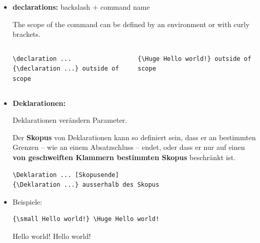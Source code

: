 \begin{frame}[fragile]
\begin{itemize}

	\item \textbf{declarations:} backslash $+$ command name
	
	The scope of the command can be defined by an environment or with curly brackets. 

\vspace{-.5cm}

\begin{columns}
	
\begin{lstlisting}
\declaration ... 
{\declaration ...} outside of scope

\end{lstlisting}
	
	
\begin{lstlisting}
{\Huge Hello world!} outside of scope
\end{lstlisting}
	
\end{columns}
	
\end{itemize}

\end{frame}


\begin{frame}

\begin{itemize}
\item \textbf{Deklarationen:}

Deklarationen verändern Parameter. 

Der \textbf{Skopus} von Deklarationen kann so definiert sein, dass er an bestimmten Grenzen -- wie an einem Absatzschluss -- endet, oder dass er nur auf einen \textbf{von geschweiften Klammern bestimmten Skopus} beschränkt ist.

\begin{lstlisting}
\Deklaration ... [Skopusende]
{\Deklaration ...} ausserhalb des Skopus
\end{lstlisting}

	\pause 

\item Beispiele:

\begin{lstlisting}
{\small Hello world!} \Huge Hello world!
\end{lstlisting}

\pause 

\ea 
{\tiny Hello world!} \Huge Hello world!

\z 

\end{itemize}

\end{frame}


